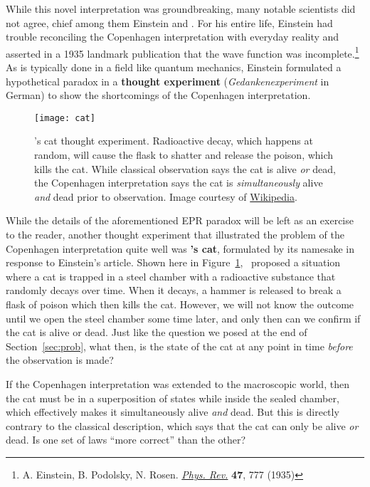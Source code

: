 While this novel interpretation was groundbreaking, many notable scientists did not agree, chief among them Einstein and \Sch. For his entire life, Einstein had trouble reconciling the Copenhagen interpretation with everyday reality and asserted in a 1935 landmark publication that the wave function was incomplete.\footnote{A. Einstein, B. Podolsky, N. Rosen. \href{https://journals.aps.org/pr/abstract/10.1103/PhysRev.47.777}{\emph{Phys. Rev.}} \textbf{47}, 777 (1935)} As is typically done in a field like quantum mechanics, Einstein formulated a hypothetical paradox in a \textbf{thought experiment} (\emph{Gedankenexperiment} in German) to show the shortcomings of the Copenhagen interpretation. \par 

\begin{figure}[!h]
	\centering
	\texttt{[image: cat]}
	\caption{\Sch's cat thought experiment. Radioactive decay, which happens at random, will cause the flask to shatter and release the poison, which kills the cat. While classical observation says the cat is alive \emph{or} dead, the Copenhagen interpretation says the cat is \emph{simultaneously} alive \emph{and} dead prior to observation. Image courtesy of \href{https://en.wikipedia.org/wiki/Schrödinger\%27s_cat}{Wikipedia}.}
	\label{fig:cat}
\end{figure}

While the details of the aforementioned EPR paradox will be left as an exercise to the reader, another thought experiment that illustrated the problem of the Copenhagen interpretation quite well was \textbf{\Sch's cat}, formulated by its namesake in response to Einstein's article. Shown here in Figure~\ref{fig:cat}, \Sch\ proposed a situation where a cat is trapped in a steel chamber with a radioactive substance that randomly decays over time. When it decays, a hammer is released to break a flask of poison which then kills the cat. However, we will not know the outcome until we open the steel chamber some time later, and only then can we confirm if the cat is alive or dead. Just like the question we posed at the end of Section~\ref{sec:prob}, what then, is the state of the cat at any point in time \emph{before} the observation is made? \par

If the Copenhagen interpretation was extended to the macroscopic world, then the cat must be in a superposition of states while inside the sealed chamber, which effectively makes it simultaneously alive \emph{and} dead. But this is directly contrary to the classical description, which says that the cat can only be alive \emph{or} dead. Is one set of laws ``more correct'' than the other? \par 

